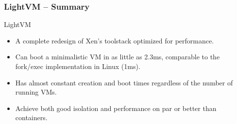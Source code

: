\begin{frame}[plain]
	\frametitle{LightVM -- Summary}
	
	LightVM
\begin{itemize}			
	\item  A complete redesign of Xen's toolstack optimized for performance.
	\item Can boot a minimalistic VM in as little as 2.3ms, comparable to the fork/exec implementation in Linux (1ms).  
	\item Has almost
	constant creation and boot times regardless of the number
	of running VMs.
	\item  Achieve both good isolation and performance
	on par or better than containers. 
	
	
\end{itemize}	

	
\end{frame}
